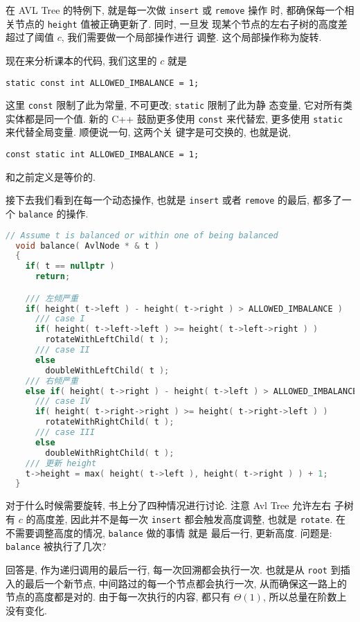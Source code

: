 \documentclass[a4paper]{ctexart}
\theoremstyle{definition}
\theoremstyle{definition}
\begin{document}
在 AVL Tree 的特例下, 就是每一次做 \verb|insert| 或 \verb|remove| 操作
时, 都确保每一个相关节点的 \verb|height| 值被正确更新了. 同时, 一旦发
现某个节点的左右子树的高度差超过了阈值 $c$, 我们需要做一个局部操作进行
调整. 这个局部操作称为旋转.

现在来分析课本的代码, 我们这里的 $c$ 就是
\begin{verbatim}
static const int ALLOWED_IMBALANCE = 1;
\end{verbatim}
这里 \verb|const| 限制了此为常量, 不可更改; \verb|static| 限制了此为静
态变量, 它对所有类实体都是同一个值. 新的 C++ 鼓励更多使用 \verb|const|
来代替宏, 更多使用 \verb|static| 来代替全局变量. 顺便说一句, 这两个关
键字是可交换的, 也就是说,
\begin{verbatim}
const static int ALLOWED_IMBALANCE = 1;
\end{verbatim}
和之前定义是等价的.

接下去我们看到在每一个动态操作, 也就是 \verb|insert| 或者
\verb|remove| 的最后, 都多了一个 \verb|balance| 的操作.

\begin{lstlisting}[language=C++]
  // Assume t is balanced or within one of being balanced
  void balance( AvlNode * & t )
  {
    if( t == nullptr )
      return;

    /// 左倾严重  
    if( height( t->left ) - height( t->right ) > ALLOWED_IMBALANCE )
      /// case I
      if( height( t->left->left ) >= height( t->left->right ) )
        rotateWithLeftChild( t );
      /// case II
      else
        doubleWithLeftChild( t );
    /// 右倾严重  
    else if( height( t->right ) - height( t->left ) > ALLOWED_IMBALANCE )
      /// case IV
      if( height( t->right->right ) >= height( t->right->left ) )
        rotateWithRightChild( t );
      /// case III
      else
        doubleWithRightChild( t );
    /// 更新 height            
    t->height = max( height( t->left ), height( t->right ) ) + 1;
  }
\end{lstlisting}

对于什么时候需要旋转, 书上分了四种情况进行讨论. 注意 Avl Tree 允许左右
子树有 $c$ 的高度差, 因此并不是每一次 \verb|insert| 都会触发高度调整,
也就是 \verb|rotate|. 在不需要调整高度的情况, \verb|balance| 做的事情
就是 最后一行, 更新高度. 问题是: \verb|balance| 被执行了几次?

回答是, 作为递归调用的最后一行, 每一次回溯都会执行一次. 也就是从
\verb|root| 到插入的最后一个新节点, 中间路过的每一个节点都会执行一次,
从而确保这一路上的节点的高度都是对的. 由于每一次执行的内容, 都只有
$\Theta(1)$, 所以总量在阶数上没有变化.
\end{document}
